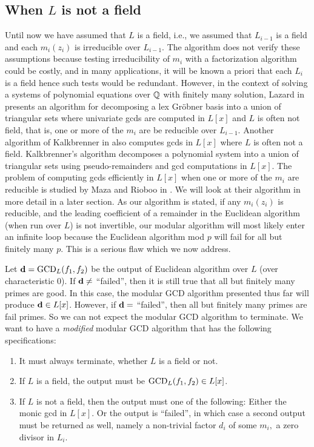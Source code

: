 \documentclass[10pt]{article}
\begin{document}
\subsection{When $L$ is not a field}
Until now we have assumed that $L$ is a field, i.e., we assumed
that $L_{i-1}$ is a field and each $m_i(z_i)$ is irreducible over $L_{i-1}.$
The algorithm does not verify these assumptions because testing
irreducibility of $m_i$ with a factorization algorithm could be costly,
and in many applications, it will be known a priori that
each $L_i$ is a field hence such tests would be redundant.
However, in the context of solving a systems of polynomial equations
over ${\mathbb Q}$ with finitely many solution, Lazard in \cite{Lazard} presents
an algorithm for decomposing a lex Gr\"obner basis into a union of triangular sets
where univariate gcds are computed in $L[x]$ and $L$ is often not field,
that is, one or more of the $m_i$ are be reducible over $L_{i-1}$.
Another algorithm of Kalkbrenner in \cite{Kalkbrenner} also computes
gcds in $L[x]$ where $L$ is often not a field.
Kalkbrenner's algorithm decomposes a polynomial system into
a union of triangular sets using pseudo-remainders and gcd computations in $L[x].$
The problem of computing gcds efficiently in $L[x]$ when one or more of the
$m_i$ are reducible is studied by Maza and Rioboo in \cite{Maza}.
We will look at their algorithm in more detail in a later section.
As our algorithm is stated, if any $m_i(z_i)$ is reducible, and
the leading coefficient of a remainder in the Euclidean algorithm
(when run over $L$) is not invertible, our modular algorithm
will most likely enter an infinite loop because the
Euclidean algorithm mod $p$ will fail for all but finitely many $p$.
This is a serious flaw which we now address.

Let ${\bf d} = {\rm GCD}_L(f_1,f_2)$ be the output of
Euclidean algorithm over $L$ (over characteristic 0).
If ${\bf d} \neq$ ``failed'', then it is still true that all but
finitely many primes are good. In this case, the modular GCD algorithm
presented thus far will produce ${\bf d} \in L[x]$.
However, if ${\bf d}=$ ``failed'', then all but finitely many primes
are fail primes. So we can not expect the modular GCD algorithm to terminate.
We want to have a {\em modified} modular GCD algorithm that has
the following specifications:

\begin{enumerate}
\item It must always terminate, whether $L$ is a field or not.
\item If $L$ is a field, the output must be ${\rm GCD}_L(f_1,f_2) \in L[x]$.
\item If $L$ is not a field, then the output must one of the
following: Either the monic gcd in $L[x]$. Or the output
is ``failed'', in which case a second output must
be returned as well, namely a non-trivial factor $d_i$ of some $m_i,$
a zero divisor in $L_i$.
\end{enumerate}
\end{document}
